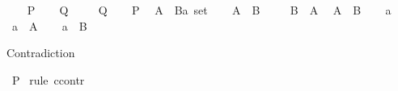 \begin{isabellebody}
%
\isadelimproof
%
\endisadelimproof
%
\isatagproof
{}\isamarkupfalse%
\isanewline
\ \ \isamarkupfalse%
\ {\isachardoublequoteopen}P{\isachardoublequoteclose}\isanewline
\ \ \isamarkupfalse%
\ {\isachardoublequoteopen}Q{\isachardoublequoteclose}\ \isamarkupfalse%
\isanewline
{}\isamarkupfalse%
\isanewline
\ \ \isamarkupfalse%
\ {\isachardoublequoteopen}Q{\isachardoublequoteclose}\isanewline
\ \ \isamarkupfalse%
\ {\isachardoublequoteopen}P{\isachardoublequoteclose}\ \isamarkupfalse%
\isanewline
{}\isamarkupfalse%
%
\endisatagproof
{\isafoldproof}%
%
\isadelimproof
\isanewline
%
\endisadelimproof
\isanewline
{}\isamarkupfalse%
\ {\isachardoublequoteopen}A\ {\isacharequal}{\kern0pt}\ {\isacharparenleft}{\kern0pt}B{\isacharcolon}{\kern0pt}{\isacharcolon}{\kern0pt}{\isacharprime}{\kern0pt}a\ set{\isacharparenright}{\kern0pt}{\isachardoublequoteclose}\isanewline
%
\isadelimproof
%
\endisadelimproof
%
\isatagproof
{}\isamarkupfalse%
\isanewline
\ \ \isamarkupfalse%
\ {\isachardoublequoteopen}A\ {\isasymsubseteq}\ B{\isachardoublequoteclose}\ \isamarkupfalse%
\isanewline
{}\isamarkupfalse%
\isanewline
\ \ \isamarkupfalse%
\ {\isachardoublequoteopen}B\ {\isasymsubseteq}\ A{\isachardoublequoteclose}\ \isamarkupfalse%
\isanewline
{}\isamarkupfalse%
%
\endisatagproof
{\isafoldproof}%
%
\isadelimproof
\isanewline
%
\endisadelimproof
\isanewline
{}\isamarkupfalse%
\ {\isachardoublequoteopen}A\ {\isasymsubseteq}\ B{\isachardoublequoteclose}\isanewline
%
\isadelimproof
%
\endisadelimproof
%
\isatagproof
{}\isamarkupfalse%
\isanewline
\ \ \isamarkupfalse%
\ a\isanewline
\ \ \isamarkupfalse%
\ {\isachardoublequoteopen}a\ {\isasymin}\ A{\isachardoublequoteclose}\isanewline
\ \ \isamarkupfalse%
\ {\isachardoublequoteopen}a\ {\isasymin}\ B{\isachardoublequoteclose}\ \isamarkupfalse%
\isanewline
{}\isamarkupfalse%
%
\endisatagproof
{\isafoldproof}%
%
\isadelimproof
%
\endisadelimproof
%
\begin{isamarkuptext}%
Contradiction%
\end{isamarkuptext}\isamarkuptrue%
\isamarkupfalse%
\ P\isanewline
%
\isadelimproof
%
\endisadelimproof
%
\isatagproof
{}\isamarkupfalse%
\ {\isacharparenleft}{\kern0pt}rule\ ccontr{\isacharparenright}{\kern0pt}\isanewline

\end{isabellebody}
